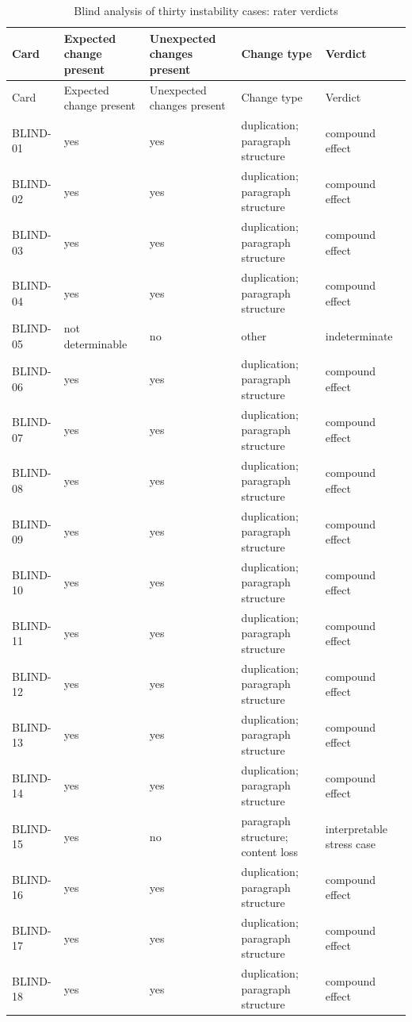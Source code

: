 \begingroup\scriptsize
\begin{longtable}{lllll}
\caption{Blind analysis of thirty instability cases: rater verdicts}\label{tab:s10} \\
\toprule
Card & Expected change present & Unexpected changes present & Change type & Verdict \\
\midrule
\endfirsthead
\toprule
Card & Expected change present & Unexpected changes present & Change type & Verdict \\
\midrule
\endhead
\bottomrule
\endfoot
BLIND-01 & yes & yes & duplication; paragraph structure & compound effect \\
BLIND-02 & yes & yes & duplication; paragraph structure & compound effect \\
BLIND-03 & yes & yes & duplication; paragraph structure & compound effect \\
BLIND-04 & yes & yes & duplication; paragraph structure & compound effect \\
BLIND-05 & not determinable & no & other & indeterminate \\
BLIND-06 & yes & yes & duplication; paragraph structure & compound effect \\
BLIND-07 & yes & yes & duplication; paragraph structure & compound effect \\
BLIND-08 & yes & yes & duplication; paragraph structure & compound effect \\
BLIND-09 & yes & yes & duplication; paragraph structure & compound effect \\
BLIND-10 & yes & yes & duplication; paragraph structure & compound effect \\
BLIND-11 & yes & yes & duplication; paragraph structure & compound effect \\
BLIND-12 & yes & yes & duplication; paragraph structure & compound effect \\
BLIND-13 & yes & yes & duplication; paragraph structure & compound effect \\
BLIND-14 & yes & yes & duplication; paragraph structure & compound effect \\
BLIND-15 & yes & no & paragraph structure; content loss & interpretable stress case \\
BLIND-16 & yes & yes & duplication; paragraph structure & compound effect \\
BLIND-17 & yes & yes & duplication; paragraph structure & compound effect \\
BLIND-18 & yes & yes & duplication; paragraph structure & compound effect \\

\end{longtable}
